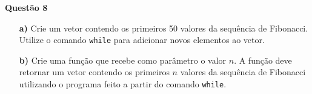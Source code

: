 \documentclass[12pt, a4paper]{article}
\begin{document}
\textbf{Questão 8}

\begin{itemize}
	\item[\textbf{a)}] Crie um vetor contendo os primeiros 50 valores da sequência de Fibonacci. Utilize o comando \texttt{while} para adicionar novos elementos ao vetor.
	
	\item[\textbf{b)}] Crie uma função que recebe como parâmetro o valor $n$. A função deve retornar um vetor contendo os primeiros $n$ valores da sequência de Fibonacci utilizando o programa feito a partir do comando \texttt{while}.
\end{itemize}




	
\end{document}
